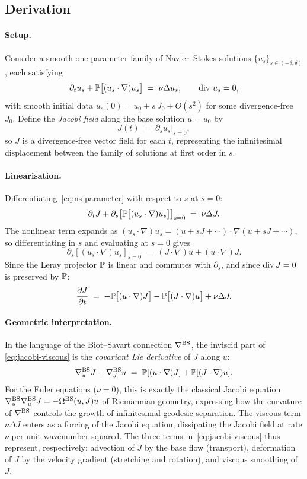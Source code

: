 \subsection{Derivation}

\paragraph{Setup.}
Consider a smooth one-parameter family of Navier--Stokes solutions
$\{u_s\}_{s \in (-\delta,\delta)}$, each satisfying
\begin{equation}\label{eq:ns-parameter}
  \partial_t u_s + \mathbb{P}\bigl[(u_s\cdot\nabla)u_s\bigr] \;=\; \nu\Delta u_s,
  \qquad \operatorname{div}\, u_s = 0,
\end{equation}
with smooth initial data $u_s(0) = u_0 + s\,J_0 + O(s^2)$ for some
divergence-free $J_0$.  Define the \emph{Jacobi field} along the base solution
$u = u_0$ by
\[
  J(t) \;=\; \partial_s u_s\big|_{s=0},
\]
so $J$ is a divergence-free vector field for each $t$, representing the
infinitesimal displacement between the family of solutions at first order in $s$.

\paragraph{Linearisation.}
Differentiating~\eqref{eq:ns-parameter} with respect to $s$ at $s = 0$:
\[
  \partial_t J
  + \partial_s\!\left[\mathbb{P}\bigl[(u_s\cdot\nabla)u_s\bigr]\right]_{s=0}
  \;=\; \nu\Delta J.
\]
The nonlinear term expands as $(u_s\cdot\nabla)u_s = (u+sJ+\cdots)\cdot\nabla(u+sJ+\cdots)$,
so differentiating in $s$ and evaluating at $s=0$ gives
\[
  \partial_s\!\left[(u_s\cdot\nabla)u_s\right]_{s=0}
  \;=\; (J\cdot\nabla)u + (u\cdot\nabla)J.
\]
Since the Leray projector $\mathbb{P}$ is linear and commutes with $\partial_s$, and
since $\operatorname{div} J = 0$ is preserved by $\mathbb{P}$:
\begin{equation}\label{eq:jacobi-viscous}
  \frac{\partial J}{\partial t}
  \;=\; -\mathbb{P}\bigl[(u\cdot\nabla)J\bigr]
        -\mathbb{P}\bigl[(J\cdot\nabla)u\bigr]
        + \nu\Delta J.
\end{equation}

\paragraph{Geometric interpretation.}
In the language of the Biot--Savart connection $\nabla^{\mathrm{BS}}$, the inviscid part of
\eqref{eq:jacobi-viscous} is the \emph{covariant Lie derivative} of $J$ along $u$:
\[
  \nabla^{\mathrm{BS}}_u J + \nabla^{\mathrm{BS}}_J u
  \;=\; \mathbb{P}[(u\cdot\nabla)J] + \mathbb{P}[(J\cdot\nabla)u].
\]
For the Euler equations ($\nu = 0$), this is exactly the classical Jacobi equation
$\nabla^{\mathrm{BS}}_u\nabla^{\mathrm{BS}}_u J = -\Omega^{\mathrm{BS}}(u,J)u$ of Riemannian geometry,
expressing how the curvature of $\nabla^{\mathrm{BS}}$ controls the growth of infinitesimal
geodesic separation.  The viscous term $\nu\Delta J$ enters as a forcing
of the Jacobi equation, dissipating the Jacobi field at rate $\nu$ per unit
wavenumber squared.  The three terms in~\eqref{eq:jacobi-viscous} thus represent,
respectively: advection of $J$ by the base flow (transport), deformation of $J$
by the velocity gradient (stretching and rotation), and viscous smoothing of $J$.

